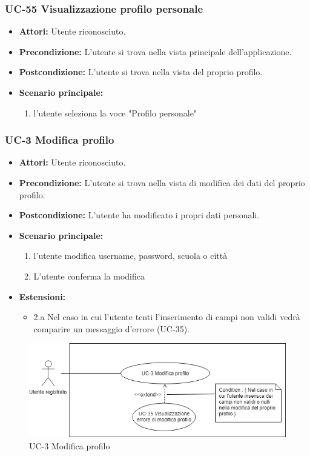 \subsubsection{UC-55 Visualizzazione profilo personale}
\begin{itemize}
	\item \textbf{Attori:} Utente riconosciuto.
	\item \textbf{Precondizione:} L'utente si trova nella vista principale dell'applicazione.
	\item \textbf{Postcondizione:} L'utente si trova nella vista del proprio profilo.
	\item \textbf{Scenario principale:}
		\begin{enumerate}
			\item l'utente seleziona la voce "Profilo personale"
		\end{enumerate}
\end{itemize}

\subsubsection{UC-3 Modifica profilo}
		\begin{itemize}
			\item \textbf{Attori:} Utente riconosciuto.
			\item \textbf{Precondizione:} L'utente si trova nella vista di modifica dei dati del proprio profilo.
			\item \textbf{Postcondizione:} L'utente ha modificato i propri dati personali.
			\item \textbf{Scenario principale:}
				\begin{enumerate}
					\item l'utente modifica username, password, scuola o città
					\item L'utente conferma la modifica
				\end{enumerate}
				\item \textbf{Estensioni:}
				\begin{itemize}
					\item 2.a Nel caso in cui l'utente tenti l'inserimento di campi non validi vedrà comparire un messaggio d'errore (UC-35).
				\end{itemize}
		\end{itemize}
		\begin{figure}[htbp]
			\centering
			\includegraphics[scale=0.7]{images/UC-3.png}
			\caption{UC-3 Modifica profilo}
		\end{figure}
	
